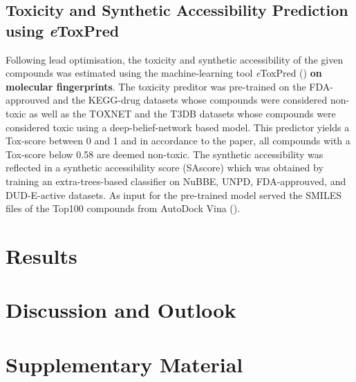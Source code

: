 \documentclass[11pt, letterpaper, titlepage]{article}
\begin{document}
\subsection{Toxicity and Synthetic Accessibility Prediction using \textit{e}ToxPred}
Following lead optimisation, the toxicity and synthetic accessibility of the given compounds was estimated using the machine-learning tool \textit{e}ToxPred (\cite{pu2019toxpred}) \textbf{on molecular fingerprints}. The toxicity preditor was pre-trained on the FDA-approuved and the KEGG-drug datasets whose compounds were considered non-toxic as well as the TOXNET and the T3DB datasets whose compounds were considered toxic using a deep-belief-network based model. This predictor yields a Tox-score between 0 and 1 and in accordance to the paper, all compounds with a Tox-score below 0.58 are deemed non-toxic. The synthetic accessibility was reflected in a synthetic accessibility score (SAscore) which was obtained by training an extra-trees-based classifier on NuBBE, UNPD, FDA-approuved, and DUD-E-active datasets. As input for the pre-trained model served the SMILES files of the Top100 compounds from AutoDock Vina (\cite{Trott.2010}).

\section{Results} 

\FloatBarrier

\section{Discussion and Outlook}

\section{Supplementary Material}

\pagebreak
\FloatBarrier
\renewcommand{\bibname}{References}  %
\printbibliography
\end{document}
